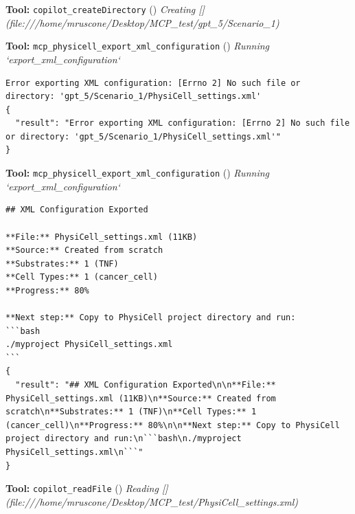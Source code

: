 \documentclass[11pt,a4paper]{article}
\begin{document}
\begin{toolokbox}
\textbf{Tool:} \texttt{copilot\_createDirectory} (\checkmark)
\textit{Creating [](file:///home/mruscone/Desktop/MCP\_test/gpt\_5/Scenario\_1)}
\end{toolokbox}
\begin{toolokbox}
\textbf{Tool:} \texttt{mcp\_physicell\_export\_xml\_configuration} (\checkmark)
\textit{Running `export\_xml\_configuration`}
\begin{lstlisting}
Error exporting XML configuration: [Errno 2] No such file or directory: 'gpt_5/Scenario_1/PhysiCell_settings.xml'
{
  "result": "Error exporting XML configuration: [Errno 2] No such file or directory: 'gpt_5/Scenario_1/PhysiCell_settings.xml'"
}
\end{lstlisting}
\end{toolokbox}
\begin{toolokbox}
\textbf{Tool:} \texttt{mcp\_physicell\_export\_xml\_configuration} (\checkmark)
\textit{Running `export\_xml\_configuration`}
\begin{lstlisting}
## XML Configuration Exported

**File:** PhysiCell_settings.xml (11KB)
**Source:** Created from scratch
**Substrates:** 1 (TNF)
**Cell Types:** 1 (cancer_cell)
**Progress:** 80%

**Next step:** Copy to PhysiCell project directory and run:
```bash
./myproject PhysiCell_settings.xml
```
{
  "result": "## XML Configuration Exported\n\n**File:** PhysiCell_settings.xml (11KB)\n**Source:** Created from scratch\n**Substrates:** 1 (TNF)\n**Cell Types:** 1 (cancer_cell)\n**Progress:** 80%\n\n**Next step:** Copy to PhysiCell project directory and run:\n```bash\n./myproject PhysiCell_settings.xml\n```"
}
\end{lstlisting}
\end{toolokbox}
\begin{toolokbox}
\textbf{Tool:} \texttt{copilot\_readFile} (\checkmark)
\textit{Reading [](file:///home/mruscone/Desktop/MCP\_test/PhysiCell\_settings.xml)}
\end{toolokbox}
\end{document}
